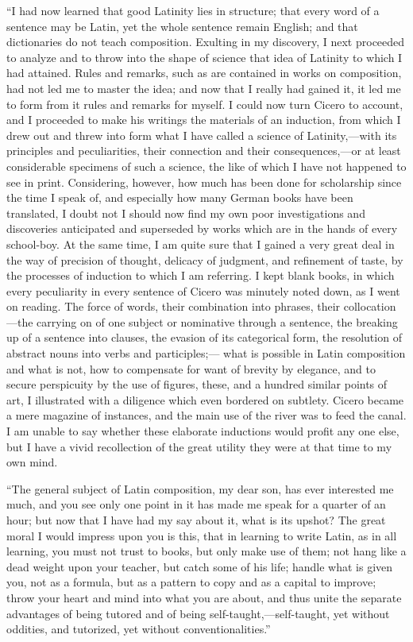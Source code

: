 ``I had now learned that good Latinity lies in structure; that
every word of a sentence may be Latin, yet the whole sentence remain
English; and that dictionaries do not teach composition. Exulting in
my discovery, I next proceeded to analyze and to throw into the shape
of science that idea of Latinity to which I had attained. Rules and
remarks, such as are contained in works on composition, had not led me
to master the idea; and now that I really had gained it, it led me to
form from it rules and remarks for myself. I could now turn Cicero to
account, and I proceeded to make his writings the materials of an
induction, from which I drew out and threw into form what I have
called a science of Latinity,—with its principles and peculiarities,
their connection and their consequences,—or at least considerable
specimens of such a science, the like of which I have not happened to
see in print. Considering, however, how much has been done for
scholarship since the time I speak of, and especially how many German
books have been translated, I doubt not I should now find my own poor
investigations and discoveries anticipated and superseded by works
which are in the hands of every school-boy. At the same time, I am
quite sure that I gained a very great deal in the way of precision of
thought, delicacy of judgment, and refinement of taste, by the
processes of induction to which I am referring. I kept blank books, in
which every peculiarity in every sentence of Cicero was minutely noted
down, as I went on reading. The force of words, their combination into
phrases, their collocation—the carrying on of one subject or
nominative through a sentence, the breaking up of a sentence into
clauses, the evasion of its categorical form, the resolution of
abstract nouns into verbs and participles;— what is possible in
Latin composition and what is not, how to compensate for want of
brevity by elegance, and to secure perspicuity by the use of figures,
these, and a hundred similar points of art, I illustrated with a
diligence which even bordered on subtlety. Cicero became a mere
magazine of instances, and the main use of the river was to feed the
canal. I am unable to say whether these elaborate inductions would
profit any one else, but I have a vivid recollection of the great
utility they were at that time to my own mind.

``The general subject of Latin composition, my dear son, has
ever interested me much, and you see only one point in it has made me
speak for a quarter of an hour; but now that I have had my say about
it, what is its upshot? The great moral I would impress upon you is
this, that in learning to write Latin, as in all learning, you must
not trust to books, but only make use of them; not hang like a dead
weight upon your teacher, but catch some of his life; handle what is
given you, not as a formula, but as a pattern to copy and as a capital
to improve; throw your heart and mind into what you are about, and
thus unite the separate advantages of being tutored and of being
self-taught,—self-taught, yet without oddities, and tutorized, yet
without conventionalities.''

